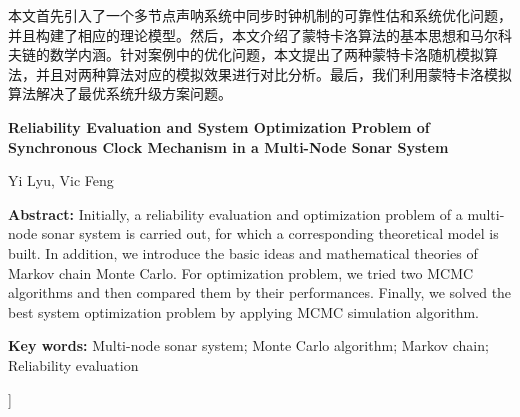 \documentclass[10.5pt,twocolumn]{jbuaa}
\begin{document}
  \begin{@twocolumnfalse}
  \maketitle
\begin{CAbstractJBUAA}
本文首先引入了一个多节点声呐系统中同步时钟机制的可靠性估和系统优化问题，并且构建了相应的理论模型。然后，本文介绍了蒙特卡洛算法的基本思想和马尔科夫链的数学内涵。针对案例中的优化问题，本文提出了两种蒙特卡洛随机模拟算法，并且对两种算法对应的模拟效果进行对比分析。最后，我们利用蒙特卡洛模拟算法解决了最优系统升级方案问题。
\end{CAbstractJBUAA}
\begin{center}
\parbox{\textwidth}{
\setlength{\parindent}{1em}
{
\centering\sihao\textbf{Reliability Evaluation and System Optimization Problem of Synchronous Clock Mechanism in a Multi-Node Sonar System}\\
} 
\vspace{-1.2mm}
\begin{center}
\wuhao Yi Lyu, Vic Feng\\[-0.1cm]
\end{center}

\wuhao
{
\textbf{Abstract:} 
Initially, a reliability evaluation and optimization problem of a multi-node sonar system is carried out, for which a corresponding theoretical model is built. In addition, we introduce the basic ideas and mathematical theories of Markov chain Monte Carlo. For optimization problem, we tried two MCMC algorithms and then compared them by their performances. Finally, we solved the best system optimization problem by applying MCMC simulation algorithm.

\textbf{Key words:} Multi-node sonar system; Monte Carlo algorithm; Markov chain; Reliability evaluation}
}
\end{center}

  \end{@twocolumnfalse}
]
\wuhao 
\end{document}
